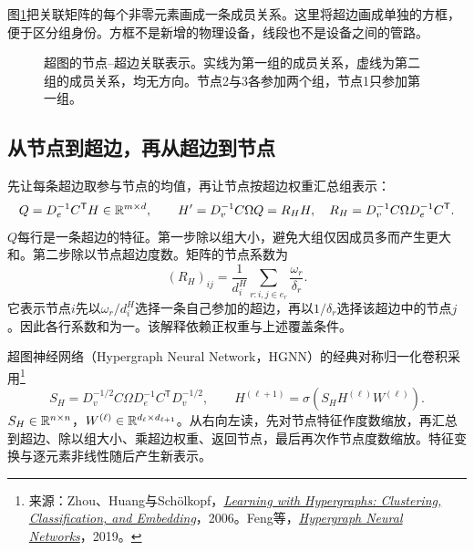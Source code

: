 图\ref{fig:graph-hyper-incidence-picture}把关联矩阵的每个非零元素画成一条成员关系。这里将超边画成单独的方框，便于区分组身份。方框不是新增的物理设备，线段也不是设备之间的管路。
\begin{figure}[htbp]
\centering
{}
\caption{超图的节点--超边关联表示。实线为第一组的成员关系，虚线为第二组的成员关系，均无方向。节点2与3各参加两个组，节点1只参加第一组。}
\label{fig:graph-hyper-incidence-picture}
\end{figure}

\subsection{从节点到超边，再从超边到节点}
先让每条超边取参与节点的均值，再让节点按超边权重汇总组表示：
\begin{equation}
 Q=D_e^{-1}C^{\mathsf T}H\in\mathbb{R}^{m\times d},\qquad
 H'=D_v^{-1}C\Omega Q=R_HH,
 \quad R_H=D_v^{-1}C\Omega D_e^{-1}C^{\mathsf T}.
 \label{eq:graph-hyper-random-walk}
\end{equation}
$Q$每行是一条超边的特征。第一步除以组大小，避免大组仅因成员多而产生更大和。第二步除以节点超边度数。矩阵的节点系数为
\begin{equation}
 (R_H)_{ij}=\frac1{d_i^H}\sum_{r:i,j\in e_r}\frac{\omega_r}{\delta_r}.
\end{equation}
它表示节点$i$先以$\omega_r/d_i^H$选择一条自己参加的超边，再以$1/\delta_r$选择该超边中的节点$j$。因此各行系数和为一。该解释依赖正权重与上述覆盖条件。

超图神经网络（Hypergraph Neural Network，HGNN）的经典对称归一化卷积采用\footnote{来源：Zhou、Huang与Sch\"olkopf，\href{https://proceedings.neurips.cc/paper_files/paper/2006/hash/dff8e9c2ac33381546d96deea9922999-Abstract.html}{\textit{Learning with Hypergraphs: Clustering, Classification, and Embedding}}，2006。Feng等，\href{https://arxiv.org/abs/1809.09401}{\textit{Hypergraph Neural Networks}}，2019。}
\begin{equation}
 S_H=D_v^{-1/2}C\Omega D_e^{-1}C^{\mathsf T}D_v^{-1/2},\qquad
 H^{(\ell+1)}=\sigma\!\left(S_HH^{(\ell)}W^{(\ell)}\right).
 \label{eq:graph-hyper-convolution}
\end{equation}
$S_H\in\mathbb{R}^{n\times n}$，$W^{(\ell)}\in\mathbb{R}^{d_\ell\times d_{\ell+1}}$。从右向左读，先对节点特征作度数缩放，再汇总到超边、除以组大小、乘超边权重、返回节点，最后再次作节点度数缩放。特征变换与逐元素非线性随后产生新表示。


